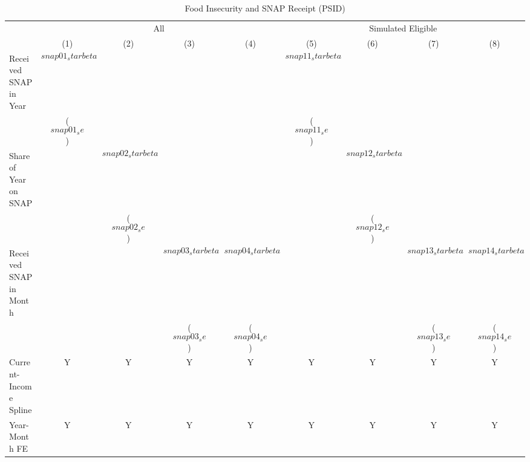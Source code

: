\begin{table}[]
    \centering
     \caption{Food Insecurity and SNAP Receipt (PSID)}
    \label{tab:snap_by_month}
\begin{tabular*}{1.36\textwidth}{@{\extracolsep{\fill}}lcccccccc}
\toprule
                       & \multicolumn{4}{c}{All}                                                                   & \multicolumn{4}{c}{Simulated Eligible}                                                    \\ \cmidrule{2-5}\cmidrule{6-9}
                       & (1)                  & (2)                  & (3)                  & (4)                  & (5)                  & (6)                  & (7)                  & (8)                  \\ \midrule \addlinespace
Received SNAP in Year  & $$snap01_starbeta$$ &                      &                      &                      & $$snap11_starbeta$$ &                      &                      &                      \\
                       & ($$snap01_se$$)     &                      &                      &                      & ($$snap11_se$$)     &                      &                      &                      \\
Share of Year on SNAP  &                      & $$snap02_starbeta$$ &                      &                      &                      & $$snap12_starbeta$$ &                      &                      \\
                       &                      & ($$snap02_se$$)     &                      &                      &                      & ($$snap12_se$$)     &                      &                      \\
Received SNAP in Month &                      &                      & $$snap03_starbeta$$ & $$snap04_starbeta$$ &                      &                      & $$snap13_starbeta$$ & $$snap14_starbeta$$ \\
                       &                      &                      & ($$snap03_se$$)     & ($$snap04_se$$)     &                      &                      & ($$snap13_se$$)     & ($$snap14_se$$)     \\ \addlinespace \midrule
                       Current-Income Spline  & Y                    & Y                    & Y                    & Y                    & Y                    & Y                    & Y                    & Y     \\
                       Year-Month FE          & Y                    & Y                    & Y                    & Y                    & Y                    & Y                    & Y                    & Y                    \\

\end{tabular*}
\end{table}
